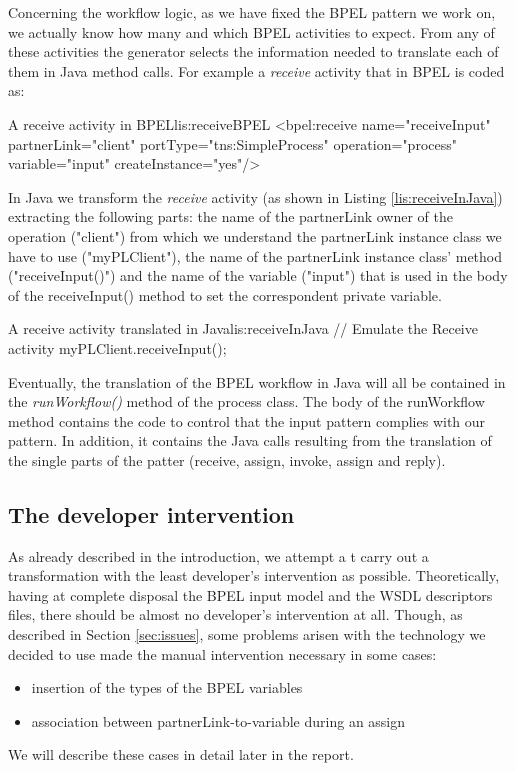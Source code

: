 Concerning the workflow logic, as we have fixed the BPEL pattern we work on, we actually know how many and which BPEL activities to expect. From any of these activities the generator selects the information needed to translate each of them in Java method calls. 
For example a \textit{receive} activity that in BPEL is coded as:

\begin{workflow-code}{A receive activity in BPEL}{lis:receiveBPEL}
<bpel:receive name="receiveInput" partnerLink="client"
                 portType="tns:SimpleProcess"
                 operation="process" variable="input"
                 createInstance="yes"/>
\end{workflow-code}

In Java we transform the \textit{receive} activity (as shown in Listing \ref{lis:receiveInJava}) extracting the following parts: the name of the partnerLink owner of the operation ("client") from which we understand the partnerLink instance class we have to use ("myPLClient"), the name of the partnerLink instance class' method ("receiveInput()") and the name of the variable ("input") that is used in the body of the receiveInput() method to set the correspondent private variable. 

\begin{java-code}{A receive activity translated in Java}{lis:receiveInJava}
// Emulate the Receive activity		
		myPLClient.receiveInput();	
\end{java-code}

Eventually, the translation of the BPEL workflow in Java will all be contained in the \textit{runWorkflow()} method of the process class. The body of the runWorkflow method contains the code to control that the input pattern complies with our pattern. In addition, it contains the Java calls resulting from the translation of the single parts of the patter (receive, assign, invoke, assign and reply).

\subsection{The developer intervention}
\label{sec:developerIntervention}
As already described in the introduction, we attempt a t carry out a transformation with the least developer's intervention as possible.
Theoretically, having at complete disposal the BPEL input model and the WSDL descriptors files, there should be almost no developer's intervention at all. Though, as described in Section \ref{sec:issues}, some problems arisen with the technology we decided to use made the manual intervention necessary in some cases:
\begin{itemize}
 \item insertion of the types of the BPEL variables
 \item association between partnerLink-to-variable during an assign
\end{itemize}
We will describe these cases in detail later in the report.

